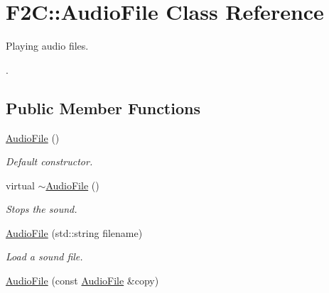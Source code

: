 \hypertarget{class_f2_c_1_1_audio_file}{
\section{F2C::AudioFile Class Reference}
\label{class_f2_c_1_1_audio_file}
}


Playing audio files. \par
.  


\subsection*{Public Member Functions}
\begin{DoxyCompactItemize}
\item 
\hypertarget{class_f2_c_1_1_audio_file_a2dc6525f4cbcaaebc66a3a4874cefd1f}{
\hyperlink{class_f2_c_1_1_audio_file_a2dc6525f4cbcaaebc66a3a4874cefd1f}{AudioFile} ()}
\label{class_f2_c_1_1_audio_file_a2dc6525f4cbcaaebc66a3a4874cefd1f}

\begin{DoxyCompactList}\small\item\em Default constructor. \item\end{DoxyCompactList}\item 
\hypertarget{class_f2_c_1_1_audio_file_a3420155d514c949628e5220902f84e51}{
virtual \hyperlink{class_f2_c_1_1_audio_file_a3420155d514c949628e5220902f84e51}{$\sim$AudioFile} ()}
\label{class_f2_c_1_1_audio_file_a3420155d514c949628e5220902f84e51}

\begin{DoxyCompactList}\small\item\em Stops the sound. \item\end{DoxyCompactList}\item 
\hyperlink{class_f2_c_1_1_audio_file_ab577e396b7f73828fe95cf1792f7767a}{AudioFile} (std::string filename)
\begin{DoxyCompactList}\small\item\em Load a sound file. \item\end{DoxyCompactList}\item 
\hypertarget{class_f2_c_1_1_audio_file_a789f70c02b96a57447d4d71d5b8e4c24}{
\hyperlink{class_f2_c_1_1_audio_file_a789f70c02b96a57447d4d71d5b8e4c24}{AudioFile} (const \hyperlink{class_f2_c_1_1_audio_file}{AudioFile} \&copy)}
\label{class_f2_c_1_1_audio_file_a789f70c02b96a57447d4d71d5b8e4c24}


\end{DoxyCompactItemize}
